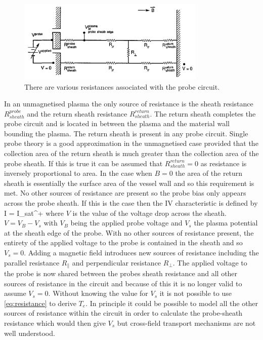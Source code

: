 \begin{figure}[H]
	\centering
	\includegraphics[width=0.8\textwidth]{sheathcircuit}
	\caption{There are various resistances associated with the probe circuit.\cite{te-determination}}
	\label{circuit}
\end{figure}
In an unmagnetised plasma the only source of resistance is the sheath resistance $R^{probe}_{sheath}$ and the return sheath resistance $R^{return}_{sheath}$. The return sheath completes the probe circuit and is located in between the plasma and the material wall bounding the plasma. The return sheath is present in any probe circuit. Single probe theory is a good approximation in the unmagnetised case provided that the collection area of the return sheath is much greater than the collection area of the probe sheath. If this is true it can be assumed that $R^{return}_{sheath} =0$ as resistance is inversely proportional to area. In the case when $B=0$ the area of the return sheath is essentially the surface area of the vessel wall and so this requirement is met. No other sources of resistance are present so the probe bias only appears across the probe sheath. If this is the case then the IV characteristic is defined by
\be 
I = I_{sat}^{+}  
\label{eq:resistance}
\ee 
where $V$ is the value of the voltage drop across the sheath. $V = V_B - V_s$ with $V_B$ being the applied probe voltage and $V_s$ the plasma potential at the sheath edge of the probe. With no other sources of resistance present, the entirety of the applied voltage to the probe is contained in the sheath and so $V_s = 0$. Adding a magnetic field introduces new sources of resistance including the parallel resistance $R_\parallel$ and perpendicular resistance $R_\perp$. The applied voltage to the probe is now shared between the probes sheath resistance and all other sources of resistance in the circuit and because of this it is no longer valid to assume $V_s = 0$. Without knowing the value for $V_s$ it is not possible to use \eqref{eq:resistance} to derive $T_e$. In principle it could be possible to model all the other sources of resistance within the circuit in order to calculate the probe-sheath resistance which would then give $V_s$ but cross-field transport mechanisms are not well understood.



